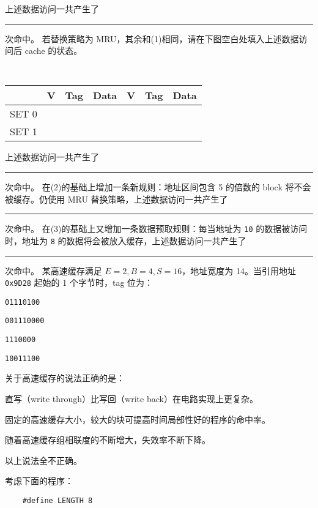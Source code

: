 \begin{problems}
\begin{table}[H]
        \end{table}
        上述数据访问一共产生了 \rule{2.5cm}{0.25mm} 次命中。
        \qn 若替换策略为 MRU，其余和(1)相同，请在下图空白处填入上述数据访问后 cache 的状态。
        \begin{table}[H]
            \tt
            \centering
            \begin{tabular}{|c|c|c|c|c|c|c|}
                \hline
                & {\quad V \quad} & {\quad Tag \quad} & {\quad Data \quad} & {\quad V \quad} & {\quad Tag \quad} & {\quad Data \quad} \\ \hline
                SET 0 &  &  &  &  &  &  \\ \hline
                SET 1 &  &  &  &  &  &  \\ \hline
            \end{tabular}
        \end{table}
        上述数据访问一共产生了 \rule{2.5cm}{0.25mm} 次命中。
        \qn 在(2)的基础上增加一条新规则：地址区间包含 5 的倍数的 block 将不会被缓存。仍使用 MRU 替换策略，上述数据访问一共产生了 \rule{2.5cm}{0.25mm} 次命中。
        \qn 在(3)的基础上又增加一条数据预取规则：每当地址为 \verb|10| 的数据被访问时，地址为 \verb|8| 的数据将会被放入缓存，上述数据访问一共产生了 \rule{2.5cm}{0.25mm} 次命中。
         某高速缓存满足 $E=2, B=4, S=16$，地址宽度为 14。当引用地址 \verb|0x9D28| 起始的 1 个字节时，tag 位为：
        \begin{choices}
            \item \verb|01110100|
            \item \verb|001110000|
            \item \verb|1110000|
            \item \verb|10011100|
        \end{choices}
         关于高速缓存的说法正确的是：
        \begin{choices}
            \item 直写（write through）比写回（write back）在电路实现上更复杂。
            \item 固定的高速缓存大小，较大的块可提高时间局部性好的程序的命中率。
            \item 随着高速缓存组相联度的不断增大，失效率不断下降。
            \item 以上说法全不正确。
        \end{choices}
         考虑下面的程序：
        \begin{verbatim}
    #define LENGTH 8

\end{verbatim}
\end{problems}
